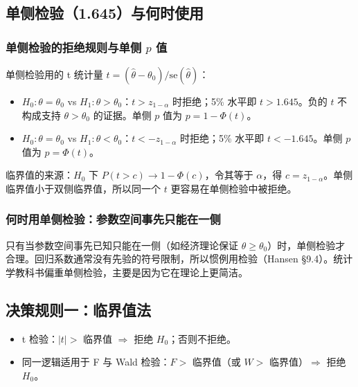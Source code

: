 \subsection{单侧检验（1.645）与何时使用}

\subsubsection{单侧检验的拒绝规则与单侧 \texorpdfstring{$p$}{p} 值}

单侧检验用的 t 统计量 $t=(\hat\theta-\theta_0)/\mathrm{se}(\hat\theta)$：
\begin{itemize}
  \item $H_0:\theta=\theta_0$ vs $H_1:\theta>\theta_0$：$t>z_{1-\alpha}$ 时拒绝；5\% 水平即 $t>1.645$。负的 $t$ 不构成支持 $\theta>\theta_0$ 的证据。单侧 $p$ 值为 $p=1-\Phi(t)$。
  \item $H_0:\theta=\theta_0$ vs $H_1:\theta<\theta_0$：$t<-z_{1-\alpha}$ 时拒绝；5\% 水平即 $t<-1.645$。单侧 $p$ 值为 $p=\Phi(t)$。
\end{itemize}
临界值的来源：$H_0$ 下 $P(t>c)\to1-\Phi(c)$，令其等于 $\alpha$，得 $c=z_{1-\alpha}$。单侧临界值小于双侧临界值，所以同一个 $t$ 更容易在单侧检验中被拒绝。

\subsubsection{何时用单侧检验：参数空间事先只能在一侧}

只有当参数空间事先已知只能在一侧（如经济理论保证 $\theta\ge\theta_0$）时，单侧检验才合理。回归系数通常没有先验的符号限制，所以惯例用检验（Hansen §9.4）。统计学教科书偏重单侧检验，主要是因为它在理论上更简洁。

\subsection{决策规则一：临界值法}

\begin{method}[临界值法]
\begin{itemize}
  \item t 检验：$|t|>$ 临界值 $\Rightarrow$ 拒绝 $H_0$；否则不拒绝。
  \item 同一逻辑适用于 F 与 Wald 检验：$F>$ 临界值（或 $W>$ 临界值）$\Rightarrow$ 拒绝 $H_0$。
\end{itemize}
\end{method}

